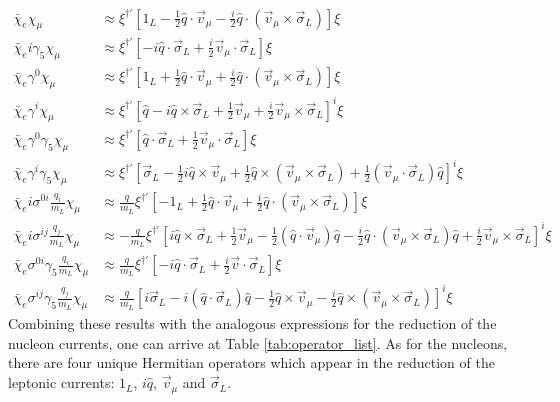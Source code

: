 \documentclass{book}[letterpaper,12pt]
\begin{document}
\begin{equation}
\begin{split}
\bar{\chi}_e\chi_{\mu}&\approx \xi^{\dag'}\left[1_L-\frac{1}{2}\hat{q}\cdot\vec{v}_{\mu}-\frac{i}{2}\hat{q}\cdot\left(\vec{v}_{\mu}\times\vec{\sigma}_L\right)\right]\xi\\
\bar{\chi}_ei\gamma_5\chi_{\mu}&\approx \xi^{\dag'}\left[-i\hat{q}\cdot\vec{\sigma}_L+\frac{i}{2}\vec{v}_{\mu}\cdot\vec{\sigma}_L\right]\xi\\
\bar{\chi}_e\gamma^0\chi_{\mu}&\approx \xi^{\dag'}\left[1_L+\frac{1}{2}\hat{q}\cdot\vec{v}_{\mu}+\frac{i}{2}\hat{q}\cdot\left(\vec{v}_{\mu}\times\vec{\sigma}_L\right)\right]\xi\\
\bar{\chi}_e\gamma^i\chi_{\mu}&\approx \xi^{\dag'}\left[\hat{q}-i\hat{q}\times\vec{\sigma}_L+\frac{1}{2}\vec{v}_{\mu}+\frac{i}{2}\vec{v}_{\mu}\times\vec{\sigma}_L\right]^i\xi\\
\bar{\chi}_e\gamma^0\gamma_5\chi_{\mu}&\approx \xi^{\dag'}\left[\hat{q}\cdot\vec{\sigma}_L+\frac{1}{2}\vec{v}_{\mu}\cdot\vec{\sigma}_L\right]\xi\\
\bar{\chi}_e\gamma^i\gamma_5\chi_{\mu}&\approx \xi^{\dag'}\left[\vec{\sigma}_L-\frac{1}{2}i\hat{q}\times\vec{v}_{\mu}+\frac{1}{2}\hat{q}\times\left(\vec{v}_{\mu}\times\vec{\sigma}_L\right)+\frac{1}{2}\left(\vec{v}_{\mu}\cdot\vec{\sigma}_L\right)\hat{q}\right]^i\xi\\
\bar{\chi}_ei\sigma^{0i}\frac{q_i}{m_L}\chi_{\mu}&\approx \frac{q}{m_L}\xi^{\dag'}\left[-1_L+\frac{1}{2}\hat{q}\cdot\vec{v}_{\mu}+\frac{i}{2}\hat{q}\cdot\left(\vec{v}_{\mu}\times\vec{\sigma}_L\right)\right]\xi\\
\bar{\chi}_ei\sigma^{ij}\frac{q_j}{m_L}\chi_{\mu}&\approx -\frac{q}{m_L}\xi^{\dag'}\left[i\hat{q}\times\vec{\sigma}_L+\frac{1}{2}\vec{v}_{\mu}-\frac{1}{2}\left(\hat{q}\cdot\vec{v}_{\mu}\right)\hat{q}-\frac{i}{2}\hat{q}\cdot\left(\vec{v}_{\mu}\times\vec{\sigma}_L\right)\hat{q}+\frac{i}{2}\vec{v}_{\mu}\times\vec{\sigma}_L\right]^i\xi\\
\bar{\chi}_e\sigma^{0i}\gamma_5\frac{q_i}{m_L}\chi_{\mu}&\approx \frac{q}{m_L}\xi^{\dag'}\left[-i\hat{q}\cdot\vec{\sigma}_L+\frac{i}{2}\vec{v}\cdot\vec{\sigma}_L\right]\xi\\
\bar{\chi}_e\sigma^{ij}\gamma_5\frac{q_j}{m_L}\chi_{\mu}&\approx \frac{q}{m_L}\left[i\vec{\sigma}_L-i\left(\hat{q}\cdot\vec{\sigma}_L\right)\hat{q}-\frac{1}{2}\hat{q}\times\vec{v}_{\mu}-\frac{i}{2}\hat{q}\times\left(\vec{v}_{\mu}\times\vec{\sigma}_L\right)\right]^i\xi
\end{split}
\end{equation}
Combining these results with the analogous expressions for the reduction of the nucleon currents, one can arrive at Table \ref{tab:operator_list}. As for the nucleons, there are four unique Hermitian operators which appear in the reduction of the leptonic currents: $1_L$, $i\hat{q}$, $\vec{v}_{\mu}$ and $\vec{\sigma}_L$. 
\end{document}
